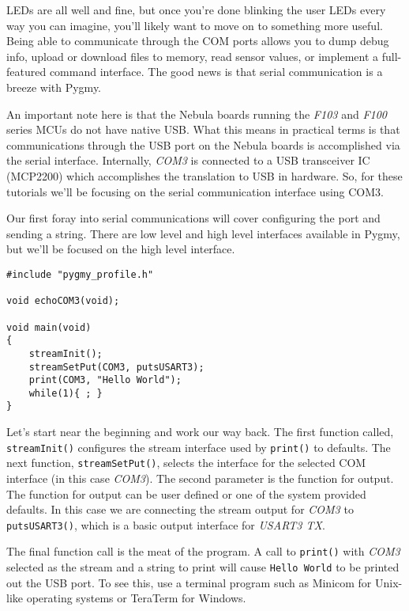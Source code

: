 \documentclass{article}
\begin{document}
LEDs are all well and fine, but once you're done blinking the user LEDs every way you can imagine, you'll likely want to move on to something more useful. Being able to communicate through the COM ports allows you to dump debug info, upload or download files to memory, read sensor values, or implement a full-featured command interface. The good news is that serial communication is a breeze with Pygmy.

An important note here is that the Nebula boards running the \emph{F103} and \emph{F100} series MCUs do not have native USB. What this means in practical terms is that communications through the USB port on the Nebula boards is accomplished via the serial interface. Internally, \emph{COM3} is connected to a USB transceiver IC (MCP2200) which accomplishes the translation to USB in hardware. So, for these tutorials we'll be focusing on the serial communication interface using COM3.

Our first foray into serial communications will cover configuring the port and sending a string. There are low level and high level interfaces available in Pygmy, but we'll be focused on the high level interface.

\begin{lstlisting}
#include "pygmy_profile.h"

void echoCOM3(void);

void main(void)
{
	streamInit();
	streamSetPut(COM3, putsUSART3);
	print(COM3, "Hello World");
	while(1){ ; }
}
\end{lstlisting}

Let's start near the beginning and work our way back. The first function called, \verb|streamInit()| configures the stream interface used by \verb|print()| to defaults. The next function, \verb|streamSetPut()|, selects the interface for the selected COM interface (in this case \emph{COM3}). The second parameter is the function for output. The function for output can be user defined or one of the system provided defaults. In this case we are connecting the stream output for \emph{COM3} to \verb|putsUSART3()|, which is a basic output interface for \emph{USART3 TX}.

The final function call is the meat of the program. A call to \verb|print()| with \emph{COM3} selected as the stream and a string to print will cause \verb|Hello World| to be printed out the USB port. To see this, use a terminal program such as Minicom for Unix-like operating systems or TeraTerm for Windows\textsuperscript{\textregistered}.
\end{document}

